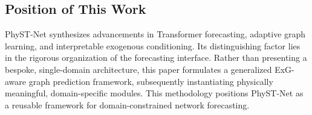 \subsection{Position of This Work}
\label{sec:related_position}
PhyST-Net synthesizes advancements in Transformer forecasting, adaptive graph learning, and interpretable exogenous conditioning. Its distinguishing factor lies in the rigorous organization of the forecasting interface. Rather than presenting a bespoke, single-domain architecture, this paper formulates a generalized ExG-aware graph prediction framework, subsequently instantiating physically meaningful, domain-specific modules. This methodology positions PhyST-Net as a reusable framework for domain-constrained network forecasting.
